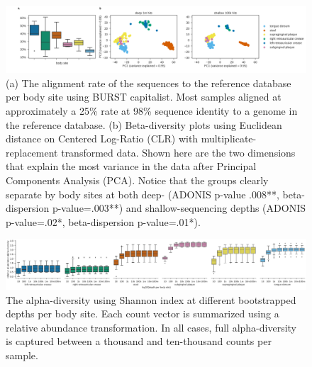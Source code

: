 \begin{figure}[hbt]
    \centering
    \includegraphics[width=0.8\linewidth]{fig/hmp_beta.png}
    \caption{
        (a) The alignment rate of the sequences to the reference database per body site using BURST capitalist. Most samples aligned at approximately a 25\% rate at 98\% sequence identity to a genome in the reference database. (b) Beta-diversity plots using Euclidean distance on Centered Log-Ratio (CLR) with multiplicate-replacement transformed data. Shown here are the two dimensions that explain the most variance in the data after Principal Components Analysis (PCA). Notice that the groups clearly separate by body sites at both deep- (ADONIS p-value .008**, beta-dispersion p-value=.003**) and shallow-sequencing depths (ADONIS p-value=.02*, beta-dispersion p-value=.01*). 
    }
    \label{fig:hmp_beta}
\end{figure}

\begin{figure}[hbt]
    \centering
    \includegraphics[width=0.8\linewidth]{fig/hmp_alpha.png}
    \caption{
        The alpha-diversity using Shannon index at different bootstrapped depths per body site. Each count vector is summarized using a relative abundance transformation. In all cases, full alpha-diversity is captured between a thousand and ten-thousand counts per sample.
     }
     \label{fig:hmp_alpha}
\end{figure}

